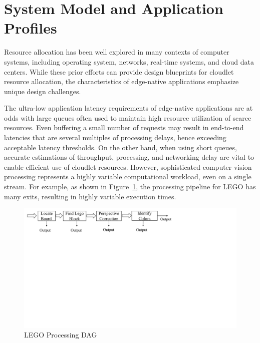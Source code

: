 \section{System Model and Application Profiles}


Resource allocation has been well explored in many contexts
of computer systems, including operating system, networks, real-time
systems, and cloud data centers.  While these prior efforts can
provide design blueprints for cloudlet resource allocation, the
characteristics of edge-native applications emphasize unique design
challenges.

The ultra-low application latency requirements of edge-native
applications are at odds with large queues often used to maintain high
resource utilization of scarce resources.  Even buffering a small
number of requests may result in end-to-end latencies that are several
multiples of processing delays, hence exceeding acceptable latency
thresholds.  On the other hand, when using short queues, accurate
estimations of throughput, processing, and networking delay are vital
to enable efficient use of cloudlet resources.  However, sophisticated
computer vision processing represents a highly variable computational
workload, even on a single stream. For example, as shown in
Figure~\ref{fig:lego-dag}, the processing pipeline for LEGO has many
exits, resulting in highly variable execution times.

\begin{figure}
\centering
\includegraphics[width=\linewidth, trim=0em 30em 20em 0em,clip]{FIGS/fig-lego-dag.pdf}
\caption{LEGO Processing DAG}
\label{fig:lego-dag}
\end{figure}

